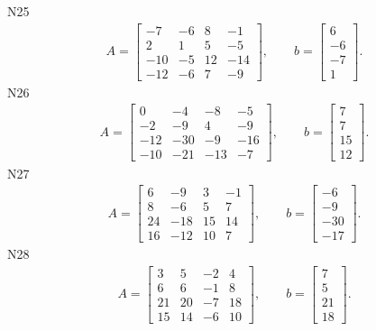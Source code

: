 \documentclass[11pt]{report}
\begin{document}
N25
\begin{align*}
 A = \left[\begin{matrix}-7 & -6 & 8 & -1\\2 & 1 & 5 & -5\\-10 & -5 & 12 & -14\\-12 & -6 & 7 & -9\end{matrix}\right],
\qquad b = \left[\begin{matrix}6\\-6\\-7\\1\end{matrix}\right]. 
 \end{align*}
N26
\begin{align*}
 A = \left[\begin{matrix}0 & -4 & -8 & -5\\-2 & -9 & 4 & -9\\-12 & -30 & -9 & -16\\-10 & -21 & -13 & -7\end{matrix}\right],
\qquad b = \left[\begin{matrix}7\\7\\15\\12\end{matrix}\right]. 
 \end{align*}
N27
\begin{align*}
 A = \left[\begin{matrix}6 & -9 & 3 & -1\\8 & -6 & 5 & 7\\24 & -18 & 15 & 14\\16 & -12 & 10 & 7\end{matrix}\right],
\qquad b = \left[\begin{matrix}-6\\-9\\-30\\-17\end{matrix}\right]. 
 \end{align*}
N28
\begin{align*}
 A = \left[\begin{matrix}3 & 5 & -2 & 4\\6 & 6 & -1 & 8\\21 & 20 & -7 & 18\\15 & 14 & -6 & 10\end{matrix}\right],
\qquad b = \left[\begin{matrix}7\\5\\21\\18\end{matrix}\right]. 
 \end{align*}
\end{document}
